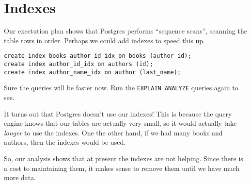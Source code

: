 \documentclass{article}
\begin{document}
\section{Indexes}
Our exectution plan shows that Postgres performs ``sequence scans'', scanning the table rows in order.  Perhaps we could add indexes to speed this up.

\begin{verbatim}
create index books_author_id_idx on books (author_id);
create index author_id_idx on authors (id);
create index author_name_idx on author (last_name);
\end{verbatim}

Sure the queries will be faster now.  Run the \texttt{EXPLAIN ANALYZE} queries again to see.

It turns out that Postgres doesn't use our indexes!  This is because the query engine knows that our tables are actually very small, so it would actually take \emph{longer} to use the indexes.  One the other hand, if we had many books and authors, then the indexes would be used.

So, our analysis shows that at present the indexes are not helping.  Since there is a cost to maintaining them, it makes sense to remove them until we have much more data.
\end{document}
